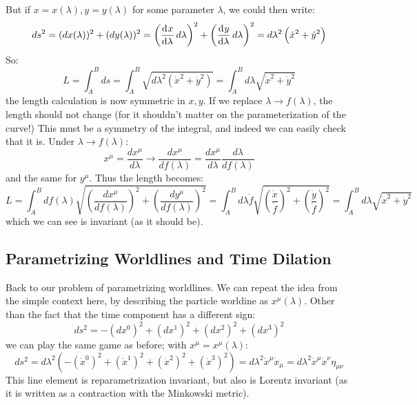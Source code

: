 But if $x = x(\lambda), y = y(\lambda)$ for some parameter $\lambda$, we could then write:
\begin{equation}
    ds^2 = (dx(\lambda))^2 + (dy(\lambda))^2 = \left(\dod{x}{\lambda}d\lambda\right)^2  + \left(\dod{y}{\lambda}d\lambda\right)^2 = d\lambda^2\left(\dot{x}^2 + \dot{y}^2\right)
\end{equation}
So:
\begin{equation}
    L = \int_A^B ds = \int_A^B \sqrt{d\lambda^2\left(\dot{x}^2 + \dot{y}^2\right)} = \int_A^B d\lambda\sqrt{\dot{x}^2 + \dot{y}^2}
\end{equation}
the length calculation is now symmetric in $x, y$. If we replace $\lambda \to f(\lambda)$, the length should not change (for it shouldn't matter on the parameterization of the curve!) This must be a symmetry of the integral, and indeed we can easily check that it is. Under $\lambda \to f(\lambda)$:
\begin{equation}
    x^\mu = \frac{dx^\mu}{d\lambda} \to \frac{dx^\mu}{df(\lambda)} = \frac{dx^\mu}{d\lambda}\frac{d\lambda}{df(\lambda)}
\end{equation}
and the same for $y^\mu$. Thus the length becomes:
\begin{equation}
    L = \int_A^B df(\lambda)\sqrt{\left(\frac{dx^\mu}{df(\lambda)}\right)^2 + \left(\frac{dy^\mu}{df(\lambda)}\right)^2} = \int_A^B d\lambda \dot{f} \sqrt{\left(\frac{\dot{x}}{\dot{f}}\right)^2 + \left(\frac{\dot{y}}{\dot{f}}\right)^2} = \int_A^B d\lambda\sqrt{\dot{x}^2 + \dot{y}^2}
\end{equation}
which we can see is invariant (as it should be).

\subsection{Parametrizing Worldlines and Time Dilation}
Back to our problem of parametrizing worldlines. We can repeat the idea from the simple context here, by describing the particle worldine as $x^\mu(\lambda)$. Other than the fact that the time component has a different sign:
\begin{equation}
    ds^2 = -(dx^0)^2 + (dx^1)^2 + (dx^2)^2 + (dx^3)^2
\end{equation}
we can play the same game as before; with $x^\mu = x^\mu(\lambda)$:
\begin{equation}
    ds^2 = d\lambda^2\left(-(\dot{x}^0)^2 + (\dot{x}^1)^2 + (\dot{x}^2)^2 + (\dot{x}^3)^2\right) = d\lambda^2 \dot{x}^\mu \dot{x}_\mu = d\lambda^2 \dot{x}^\mu \dot{x}^\nu \eta_{\mu\nu}
\end{equation}
This line element is reparametrization invariant, but also is Lorentz invariant (as it is written as a contraction with the Minkowski metric).

